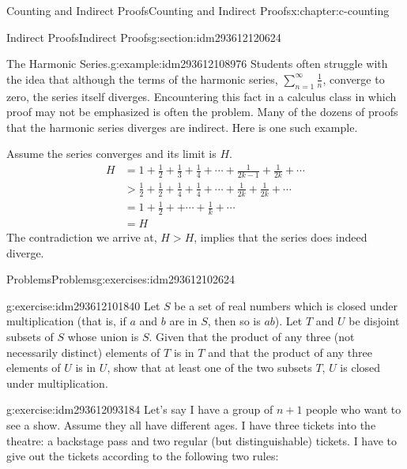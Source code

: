 \documentclass[twoside,10pt,]{book}
\numberwithin{equation}{section}
\newcommand{\gt}{>}
\begin{document}
\begin{chapterptx}{Counting and Indirect Proofs}{}{Counting and Indirect Proofs}{}{}{x:chapter:c-counting}
\begin{sectionptx}{Indirect Proofs}{}{Indirect Proofs}{}{}{g:section:idm293612120624}
\begin{example}{The Harmonic Series.}{g:example:idm293612108976}%
%
Students often struggle with the idea that although the terms of the harmonic series, \(\sum_{n=1}^{\infty} \frac{1}{n}\), converge to zero, the series itself diverges. Encountering this fact in a calculus class in which proof may not be emphasized is often the problem.  Many of the dozens of proofs that the harmonic series diverges are indirect.  Here is one such example.%
\par
Assume the series converges and its limit is \(H\).%
\begin{equation*}
\begin{split}
H &= 1 + \frac{1}{2} + \frac{1}{3} + \frac{1}{4} +\cdots + \frac{1}{2k-1} + \frac{1}{2k} + \cdots\\
& \gt  \frac{1}{2} + \frac{1}{2} + \frac{1}{4} + \frac{1}{4} +\cdots + \frac{1}{2k} + \frac{1}{2k} + \cdots\\
& = 1 + \frac{1}{2} +  +\cdots + \frac{1}{k}  + \cdots\\
& = H
\end{split}
\end{equation*}
The contradiction we arrive at, \(H \gt H\), implies that the series does indeed diverge.%
\end{example}
\end{sectionptx}
%
%
\typeout{************************************************}
\typeout{************************************************}
%
\begin{exercises-section}{Problems}{}{Problems}{}{}{g:exercises:idm293612102624}
\begin{divisionexercise}{1}{}{}{g:exercise:idm293612101840}%
Let \(S\) be a set of real numbers which is closed under multiplication (that is, if \(a\) and \(b\) are in \(S\), then so is \(a b\)). Let \(T\) and \(U\) be disjoint subsets of \(S\) whose union is \(S\). Given that the product of any three (not necessarily distinct) elements of \(T\) is in \(T\) and that the product of any three elements of \(U\) is in \(U\), show that at least one of the two subsets \(T\), \(U\) is closed under multiplication.%
\end{divisionexercise}%
\begin{divisionexercise}{2}{}{}{g:exercise:idm293612093184}%
Let's say I have a group of \(n+1\) people who want to see a show. Assume they all have different ages.  I have three tickets into the theatre: a backstage pass and two regular (but distinguishable) tickets. I have to give out the tickets according to the following two rules:%

\end{divisionexercise}
\end{exercises-section}
\end{chapterptx}
\end{document}
